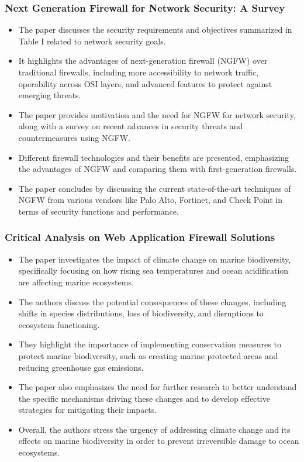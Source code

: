 \subsubsection{Next Generation Firewall for Network Security: A Survey \cite{8478973}}
\begin{itemize}
    \item The paper discusses the security requirements and objectives summarized in Table I related to network security goals.
    \item It highlights the advantages of next-generation firewall (NGFW) over traditional firewalls, including more accessibility to network traffic, operability across OSI layers, and advanced features to protect against emerging threats.
    \item The paper provides motivation and the need for NGFW for network security, along with a survey on recent advances in security threats and countermeasures using NGFW.
    \item Different firewall technologies and their benefits are presented, emphasizing the advantages of NGFW and comparing them with first-generation firewalls.
    \item The paper concludes by discussing the current state-of-the-art techniques of NGFW from various vendors like Palo Alto, Fortinet, and Check Point in terms of security functions and performance.
\end{itemize}

\subsubsection{Critical Analysis on Web Application Firewall Solutions \cite{6513431}}
\begin{itemize}
    \item The paper investigates the impact of climate change on marine biodiversity, specifically focusing on how rising sea temperatures and ocean acidification are affecting marine ecosystems.
    \item The authors discuss the potential consequences of these changes, including shifts in species distributions, loss of biodiversity, and disruptions to ecosystem functioning.
    \item They highlight the importance of implementing conservation measures to protect marine biodiversity, such as creating marine protected areas and reducing greenhouse gas emissions.
    \item The paper also emphasizes the need for further research to better understand the specific mechanisms driving these changes and to develop effective strategies for mitigating their impacts.
    \item Overall, the authors stress the urgency of addressing climate change and its effects on marine biodiversity in order to prevent irreversible damage to ocean ecosystems.
\end{itemize}

